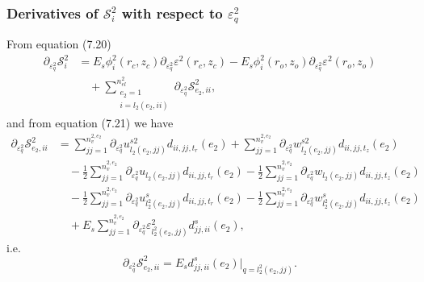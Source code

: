 \documentclass{article}
\begin{document}
\subsubsection{Derivatives of $\mathcal{S}_i^2$ with respect to $\varepsilon_q^2$} %
From equation (7.20)
\begin{align}
\partial_{\varepsilon_q^2} \mathcal{S}_i^2 &= E_s \phi_i^2(r_c,z_c) \partial_{\varepsilon_q^2} \varepsilon^2(r_c,z_c) - E_s \phi_i^2(r_o,z_o) \partial_{\varepsilon_q^2} \varepsilon^2(r_o,z_o) \nonumber\\
&\quad + \sum_{\substack{e_2=1\\ i=l_2(e_2,ii)}}^{n_{el}^2} \partial_{\varepsilon_q^2} \mathcal{S}_{e_2,ii}^2, \tag{7.36}
\end{align}
and from equation (7.21) we have
\begin{align}
\partial_{\varepsilon_q^2} \mathcal{S}_{e_2,ii}^2 &= \sum_{jj=1}^{n_v^{2,e_2}} \partial_{\varepsilon_q^2} u_{l_2(e_2,jj)}^{s2} d_{ii,jj,t_r}(e_2) + \sum_{jj=1}^{n_v^{2,e_2}} \partial_{\varepsilon_q^2} w_{l_2(e_2,jj)}^{s2} d_{ii,jj,t_z}(e_2) \nonumber\\
&\quad - \frac{1}{2} \sum_{jj=1}^{n_v^{2,e_2}} \partial_{\varepsilon_q^2} u_{l_2(e_2,jj)} d_{ii,jj,t_r}(e_2) - \frac{1}{2} \sum_{jj=1}^{n_v^{2,e_2}} \partial_{\varepsilon_q^2} w_{l_2(e_2,jj)} d_{ii,jj,t_z}(e_2) \nonumber\\
&\quad - \frac{1}{2} \sum_{jj=1}^{n_v^{2,e_2}} \partial_{\varepsilon_q^2} u_{l_2^2(e_2,jj)}^s d_{ii,jj,t_r}(e_2) - \frac{1}{2} \sum_{jj=1}^{n_v^{2,e_2}} \partial_{\varepsilon_q^2} w_{l_2^2(e_2,jj)}^s d_{ii,jj,t_z}(e_2) \nonumber\\
&\quad + E_s \sum_{jj=1}^{n_v^{2,e_2}} \partial_{\varepsilon_q^2} \varepsilon_{l_2^2(e_2,jj)}^2 d_{jj,ii}^s(e_2), \tag{7.37}
\end{align}
i.e.
\begin{equation}
\partial_{\varepsilon_q^2} \mathcal{S}_{e_2,ii}^2 = E_s d_{jj,ii}^s(e_2) \big|_{q=l_2^2(e_2,jj)}. \tag{7.38}
\end{equation}
\end{document}
